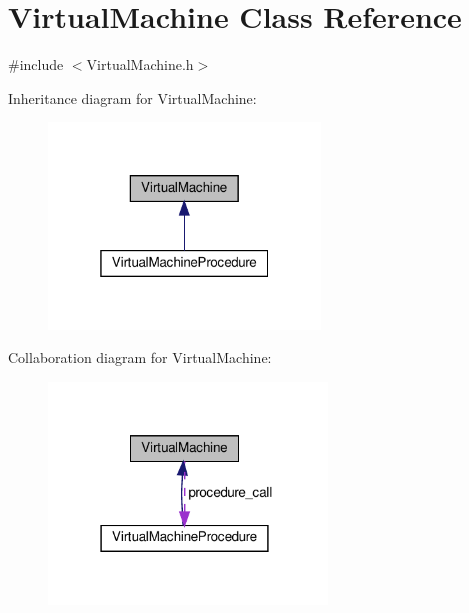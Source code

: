 \hypertarget{classVirtualMachine}{}\section{Virtual\+Machine Class Reference}
\label{classVirtualMachine}


{\ttfamily \#include $<$Virtual\+Machine.\+h$>$}



Inheritance diagram for Virtual\+Machine\+:\nopagebreak
\begin{figure}[H]
\begin{center}
\leavevmode
\includegraphics[width=205pt]{classVirtualMachine__inherit__graph}
\end{center}
\end{figure}


Collaboration diagram for Virtual\+Machine\+:\nopagebreak
\begin{figure}[H]
\begin{center}
\leavevmode
\includegraphics[width=210pt]{classVirtualMachine__coll__graph}
\end{center}
\end{figure}
